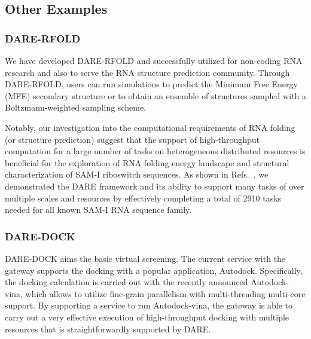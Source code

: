 \documentclass[]{svjour3}
\begin{document}
\subsection{Other Examples}
\subsubsection{DARE-RFOLD}

We have developed DARE-RFOLD and successfully utilized for non-coding RNA
research and also to serve the RNA structure prediction
community. Through DARE-RFOLD, users can run simulations to predict
the Minimum Free Energy (MFE) secondary structure or to obtain an
ensemble of structures sampled with a Boltzmann-weighted sampling
scheme.


Notably, our investigation into the computational requirements of RNA
folding (or structure prediction) suggest that the support of high-throughput
computation for a large number of tasks on heterogeneous distributed
resources is beneficial for the exploration of RNA folding energy
landscape and structural characterization of SAM-I riboswitch
sequences. As shown in Refs.~\cite{dare-ecmls11,ccpe11}, we demonstrated the DARE
framework and its ability to support many tasks of over multiple
scales and resources by effectively completing a
total of 2910 tasks needed for all known SAM-I RNA sequence family.

\subsubsection{DARE-DOCK}
DARE-DOCK aims the basic virtual screening. The current
service with the gateway supports the docking with a popular
application, Autodock\cite{autodock}. 
Specifically, the docking calculation is carried out with the recently
announced Autodock-vina, which allows to utilize fine-grain
parallelism with multi-threading multi-core support. By supporting a 
service to run Autodock-vina, the gateway is able to carry out a
very effective execution of high-throughput docking with multiple
resources that is straightforwardly supported by DARE.
\end{document}
